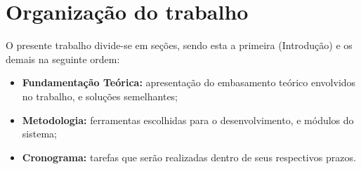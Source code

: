 \section{Organização do trabalho}
O presente trabalho divide-se em seções, sendo esta a primeira (Introdução) e os demais na seguinte ordem:

\begin{itemize}
  \item \textbf{Fundamentação Teórica:} apresentação do embasamento teórico
  envolvidos no trabalho, e soluções semelhantes;
  \item \textbf{Metodologia:} ferramentas escolhidas para o desenvolvimento,
  e módulos do sistema;
  \item \textbf{Cronograma:} tarefas que serão realizadas dentro de seus
  respectivos prazos.
\end{itemize}
